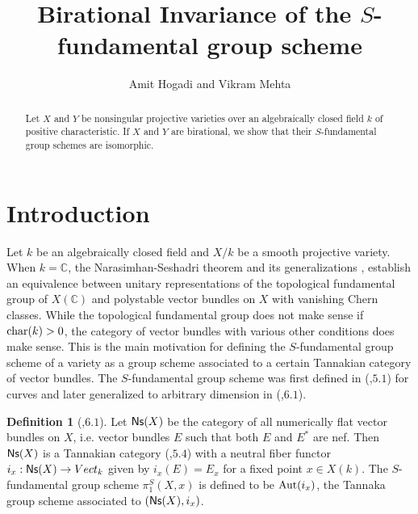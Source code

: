 \documentclass[12pt,oneside]{amsart}
\theoremstyle{plain}
\theoremstyle{definition}
\newtheorem{defn}[thm]{Definition}
\newcommand{\Aut}{{\rm Aut}}
\newcommand{\Char}{{\rm char}}
\newcommand{\C}{{\mathbb C}}
\begin{document}
\title{Birational Invariance of the $S$-fundamental group scheme}
\author{Amit Hogadi and Vikram Mehta}
\begin{abstract}Let $X$ and $Y$ be nonsingular projective varieties over an algebraically closed field $k$ of positive characteristic. If $X$ and $Y$ are birational, we show that their $S$-fundamental group schemes are isomorphic. 
\end{abstract}
\maketitle
\section{Introduction}

Let $k$ be an algebraically closed field and $X/k$ be a smooth projective variety. When $k=\C$, the Narasimhan-Seshadri theorem \cite{ns} and its generalizations \cite{mr2}, establish an equivalence between unitary representations of the topological fundamental group of $X(\C)$ and polystable vector bundles on $X$ with vanishing Chern classes. While the topological fundamental group does not make sense if $\Char(k)>0$, the category of vector bundles with various other conditions does make sense. This is the main motivation for defining the $S$-fundamental group scheme of a variety as a group scheme associated to a certain Tannakian category of vector bundles. The $S$-fundamental group scheme was first defined in (\cite{bps},$5.1$) for curves and later generalized   to arbitrary dimension in (\cite{langer1},$6.1$). 
\begin{defn}[\cite{langer1},$6.1$]
Let ${\sf Ns}(X)$ be the category of all numerically flat vector bundles on $X$, i.e. vector bundles $E$ such that both $E$ and $E^*$ are nef. Then ${\sf Ns}(X)$ is a Tannakian category (\cite{langer1},$5.4$) with a neutral fiber functor $i_x:{\sf Ns}(X)\to Vect_k$ given by $i_x(E)= E_x$ for a fixed point $x\in X(k)$. The $S$-fundamental group scheme $\pi_1^S(X,x)$ is defined to be $\Aut(i_x)$, the Tannaka group scheme associated to $({\sf Ns}(X),i_x)$. 
\end{defn}
\end{document}
